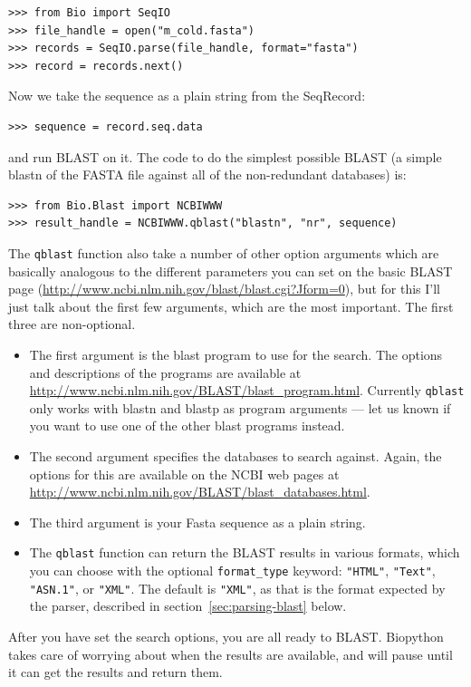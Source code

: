 \documentclass{report}
\begin{document}
\begin{verbatim}
>>> from Bio import SeqIO
>>> file_handle = open("m_cold.fasta")
>>> records = SeqIO.parse(file_handle, format="fasta")
>>> record = records.next()
\end{verbatim}

Now we take the sequence as a plain string from the SeqRecord:
\begin{verbatim}
>>> sequence = record.seq.data
\end{verbatim}
and run BLAST on it. The code to do the simplest possible BLAST
(a simple blastn of the FASTA file against all of the non-redundant
databases) is:

\begin{verbatim}
>>> from Bio.Blast import NCBIWWW
>>> result_handle = NCBIWWW.qblast("blastn", "nr", sequence)
\end{verbatim}

The \verb|qblast| function also take a number of other option arguments
which are basically analogous to the different parameters you can set
on the basic BLAST page
(\url{http://www.ncbi.nlm.nih.gov/blast/blast.cgi?Jform=0}),
but for this I'll just talk about the first few arguments, which are
the most important. The first three are non-optional.

\begin{itemize}
\item The first argument is the blast program to use for the search. The
options and descriptions of the programs are available at
\url{http://www.ncbi.nlm.nih.gov/BLAST/blast_program.html}.
Currently \verb|qblast| only works with blastn and blastp as program
arguments --- let us known if you want to use one of the other blast
programs instead.
\item The second argument specifies the databases to search against. Again,
the options for this are available on the NCBI web pages at
\url{http://www.ncbi.nlm.nih.gov/BLAST/blast_databases.html}.
\item The third argument is your Fasta sequence as a plain string.
\item The \verb|qblast| function can return the BLAST results in various
formats, which you can choose with the optional \verb|format_type| keyword:
\verb|"HTML"|, \verb|"Text"|, \verb|"ASN.1"|, or \verb|"XML"|.
The default is \verb|"XML"|, as that is the format expected by the parser,
described in section~\ref{sec:parsing-blast} below.
\end{itemize}

After you have set the search options, you are all ready to BLAST.
Biopython takes care of worrying about when the results are available,
and will pause until it can get the results and return them.
\end{document}
